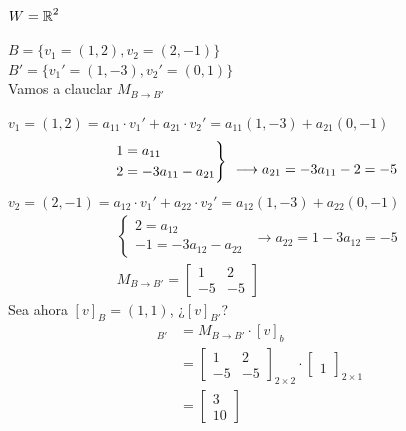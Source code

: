 \Ej\\
$W=\operatorname{\mathbb{R}}^2$

$B=\{v_1=(1,2),v_2=(2,-1)\}$\\
$B'=\{v_1'=(1,-3),v_2'=(0,1)\}$\\
Vamos a clauclar $M_{B\to B'}$

$v_1=(1,2)=a_{11}\cdot v_1'+a_{21}\cdot v_2'=a_{11}(1,-3)+a_{21}(0,-1)$\[ \begin{rcases}
	1=a_{11}\\
	2=-3a_{11}-a_{21}
\end{rcases}\begin{array}{l}
\\
\longrightarrow a_{21}=-3a_{11}-2=-5
\end{array} \]$v_2=(2,-1)=a_{12}\cdot v_1'+a_{22}\cdot v_2'=a_{12}(1,-3)+a_{22}(0,-1)$\[ \begin{array}{c}
\begin{cases}
2=a_{12}\\
-1=-3a_{12}-a_{22}
\end{cases}\begin{array}{l}
\\
\longrightarrow a_{22}=1-3a_{12}=-5
\end{array}\\
M_{B\to B'}=\begin{bmatrix}
		1 & 2\\
		-5 & -5
\end{bmatrix}
\end{array} \]
Sea ahora $[v]_B=(1,1)$, ¿$[v]_{B'}$?\begin{align*}
	[v]_{B'}&=M_{B\to B'}\cdot[v]_b\\
	&=\begin{bmatrix}
		1 & 2\\
		-5 & -5
	\end{bmatrix}_{2\times 2}\cdot\begin{bmatrix}
	\\
	1
	\end{bmatrix}_{2\times1}\\
	&=\begin{bmatrix}
		3\\
		10
	\end{bmatrix}
\end{align*}
